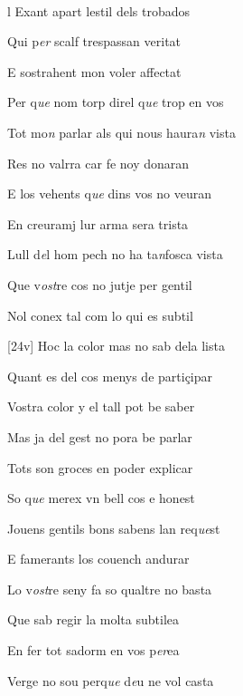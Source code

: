 \documentclass[12pt]{article}
\renewcommand{\espaiAbansEtiquetaPoema}{\vspace{0ex}}
\begin{document}
\begin{estrofa}

\espaiAbansEtiquetaPoema

\\

\end{estrofa}


\begin{estrofa}

 l Exant apart lestil dels trobados

 Qui p\textit{er} scalf trespassan veritat

 E sostrahent mon voler affectat

 Per q\textit{ue} nom torp direl q\textit{ue} trop en vos

 Tot mo\textit{n} parlar als qui nous haura\textit{n} vista

 Res no valrra car fe noy donaran

 E los vehents q\textit{ue} dins vos no veuran

 En creuramj lur arma sera trista

\end{estrofa}



\begin{estrofa}

 Lull d\textit{e}l hom pech no ha ta\textit{n}fosca vista

 Que v\textit{ost}re cos no jutje per gentil

 Nol conex tal com lo qui es subtil

 [24v] Hoc la color mas no sab dela lista

 Quant es del cos menys de parti\c{c}ipar

 

 Vostra color y el tall pot be saber

 Mas ja del gest no pora be parlar

\end{estrofa}



\begin{estrofa}

 Tots son groces en poder explicar

 So q\textit{ue} merex vn bell cos e honest

 Jouens gentils bons sabens lan req\textit{ue}st

 E famerants los couench andurar

 Lo v\textit{ost}re seny fa so qualtre no basta

 Que sab regir la molta subtilea

 En fer tot sadorm en vos p\textit{er}ea

 Verge no sou perq\textit{ue} d\textit{e}u ne vol casta

\end{estrofa}
\end{document}
